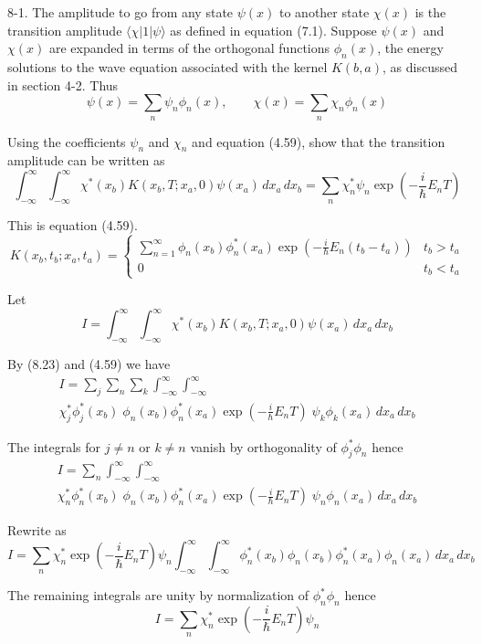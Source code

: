 \documentclass[12pt]{article}
\begin{document}
8-1.
The amplitude to go from any state $\psi(x)$ to another
state $\chi(x)$ is the transition amplitude $\langle\chi|1|\psi\rangle$
as defined in equation (7.1).
Suppose $\psi(x)$ and $\chi(x)$ are expanded in terms of the orthogonal
functions $\phi_n(x)$, the energy solutions to the wave equation associated
with the kernel $K(b,a)$, as discussed in section 4-2. Thus
\begin{equation*}
\psi(x)=\sum_n\psi_n\phi_n(x),\qquad\chi(x)=\sum_n\chi_n\phi_n(x)
\tag{8.23}
\end{equation*}

Using the coefficients $\psi_n$ and $\chi_n$ and equation (4.59),
show that the transition amplitude can be written as
\begin{equation*}
\int_{-\infty}^\infty\int_{-\infty}^\infty
\chi^*(x_b)K(x_b,T;x_a,0)\psi(x_a)\,dx_a\,dx_b
=\sum_n\chi_n^*\psi_n\exp\left(-\frac{i}{\hbar}E_nT\right)
\tag{8.24}
\end{equation*}

This is equation (4.59).
\begin{equation*}
K(x_b,t_b;x_a,t_a)=\begin{cases}
\sum_{n=1}^\infty\phi_n(x_b)\phi_n^*(x_a)
\exp\left(-\frac{i}{\hbar}E_n(t_b-t_a)\right) & t_b>t_a
\\
0 & t_b<t_a
\end{cases}
\tag{4.59}
\end{equation*}

Let
\begin{equation*}
I=\int_{-\infty}^\infty\int_{-\infty}^\infty
\chi^*(x_b)K(x_b,T;x_a,0)\psi(x_a)\,dx_a\,dx_b
\end{equation*}

By (8.23) and (4.59) we have
\begin{multline*}
I=\sum_j\sum_n\sum_k\int_{-\infty}^\infty\int_{-\infty}^\infty
\\
\chi_j^*\phi_j^*(x_b)
\;
\phi_n(x_b)\phi_n^*(x_a)\exp\left(-\frac{i}{\hbar}E_nT\right)
\;
\psi_k\phi_k(x_a)
\,dx_a\,dx_b
\end{multline*}

The integrals for $j\ne n$ or $k\ne n$ vanish
by orthogonality of $\phi_j^*\phi_n$ hence
\begin{multline*}
I=\sum_n\int_{-\infty}^\infty\int_{-\infty}^\infty
\\
\chi_n^*\phi_n^*(x_b)
\;
\phi_n(x_b)\phi_n^*(x_a)\exp\left(-\frac{i}{\hbar}E_nT\right)
\;
\psi_n\phi_n(x_a)
\,dx_a\,dx_b
\end{multline*}

Rewrite as
\begin{equation*}
I=\sum_n\chi_n^*\exp\left(-\frac{i}{\hbar}E_nT\right)\psi_n
\int_{-\infty}^\infty\int_{-\infty}^\infty
\phi_n^*(x_b)\phi_n(x_b)
\phi_n^*(x_a)\phi_n(x_a)
\,dx_a\,dx_b
\end{equation*}

The remaining integrals are unity by normalization of $\phi_n^*\phi_n$ hence
\begin{equation*}
I=\sum_n\chi_n^*\exp\left(-\frac{i}{\hbar}E_nT\right)\psi_n
\end{equation*}
\end{document}
